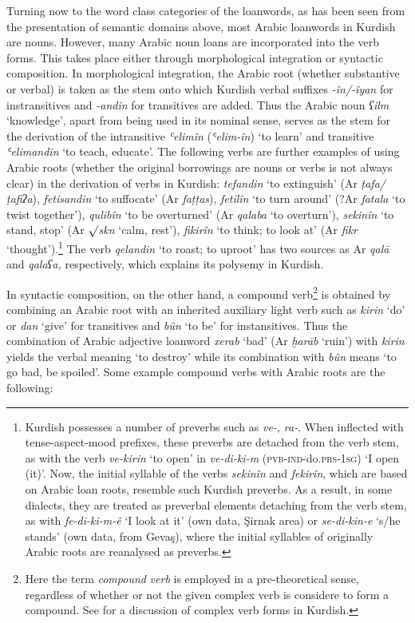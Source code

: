 \documentclass[output=paper]{langsci/langscibook}
\begin{document}
Turning now to the word class categories of the loanwords, as has been seen from the presentation of semantic domains above, most Arabic loanwords in Kurdish are nouns. However, many Arabic noun loans are incorporated into the verb forms. This takes place either through morphological integration or syntactic composition. In morphological integration, the Arabic root (whether substantive or verbal) is taken as the stem onto which Kurdish verbal suffixes \textit{{}-în/-îyan} for instransitives and \textit{{}-andin} for transitives are added. Thus the Arabic noun \textit{ʕilm} ‘knowledge’, apart from being used in its nominal sense, serves as the stem for the derivation of the intransitive \textit{ʿelimîn} (\textit{ʿelim-în}) ‘to learn’ and transitive \textit{ʿelimandin} ‘to teach, educate’. The following verbs are further examples of using Arabic roots (whether the original borrowings are nouns or verbs is not always clear) in the derivation of verbs in Kurdish: \textit{tefandin} ‘to extinguish’ (Ar \textit{ṭafa/ṭafiʔa}), \textit{fetisandin} ‘to suffocate’ (Ar \textit{faṭṭas}), \textit{fetilîn} ‘to turn around’ (?Ar \textit{fatala} ‘to twist together’), \textit{qulibîn} ‘to be overturned’ (Ar \textit{qalaba} ‘to overturn’), \textit{sekinîn} ‘to stand, stop’ (Ar ${\surd}$\textit{skn} ‘calm, rest’), \textit{fikirîn} ‘to think; to look at’ (Ar \textit{fikr} ‘thought’).\footnote{Kurdish possesses a number of preverbs such as \textit{ve-,} \textit{ra-}. When inflected with tense-aspect-mood prefixes, these preverbs are detached from the verb stem, as with the verb \textit{ve-kirin} ‘to open’ in \textit{ve-di-ki-m} (\textsc{pvb-ind}{}-do.\textsc{prs-1sg}) ‘I open (it)’. Now, the initial syllable of the verbs \textit{sekinîn} and \textit{fekirîn}, which are based on Arabic loan roots, resemble such Kurdish preverbs. As a result, in some dialects, they are treated as preverbal elements detaching from the verb stem, as with \textit{fe-di-ki-m-ê} ‘I look at it’ (own data, Şirnak area) or \textit{se-di-kin-e} ‘s/he stands’ (own data, from Gevaş), where the initial syllables of originally Arabic roots are reanalysed as preverbs.}  The verb \textit{qelandin} ‘to roast; to uproot’ has two sources as Ar \textit{qalā} and \textit{qalaʕa,} respectively, which explains its polysemy in Kurdish. 

In syntactic composition, on the other hand, a compound verb\footnote{Here the term \textit{compound} \textit{verb} is employed in a pre-theoretical sense, regardless of whether or not the given complex verb is considere to form a compound. See \citet{Haig2002} for a discussion of complex verb forms in Kurdish.}  is obtained by combining an Arabic root with an inherited auxiliary light verb such as \textit{kirin} ‘do’ or \textit{dan} ‘give’ for transitives and \textit{bûn} ‘to be’ for instansitives. Thus the combination of Arabic adjective loanword \textit{xerab} ‘bad’ (Ar \textit{ḫarāb} ‘ruin’) with \textit{kirin} yields the verbal meaning ‘to destroy’ while its combination with \textit{bûn} means ‘to go bad, be spoiled’. Some example compound verbs with Arabic roots are the following: 
\end{document}
